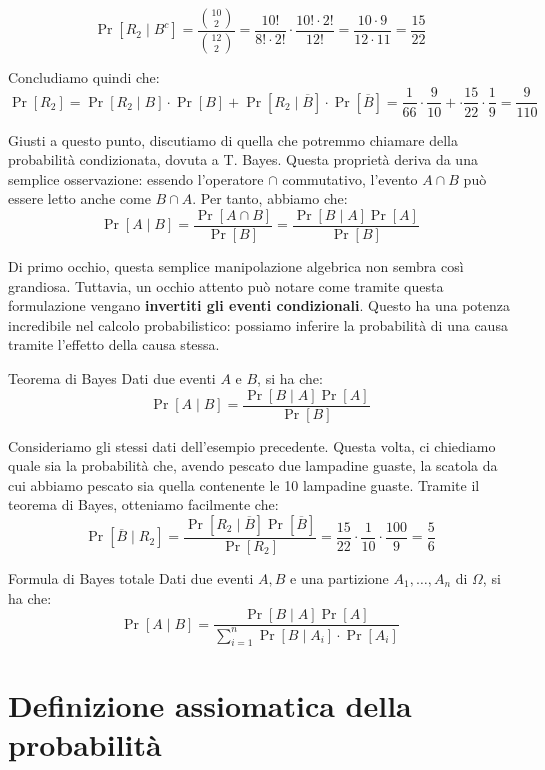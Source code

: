 \documentclass[a4paper, 12pt]{report}
\begin{document}
    \[ \Pr[R_2  \mid  B^c] = \frac{\binom{10}{2}}{\binom{12}{2}} = \frac{10!}{8! \cdot 2!} \cdot \frac{10! \cdot 2!}{12!} = \frac{10 \cdot 9}{12 \cdot 11} = \frac{15}{22}\]

    Concludiamo quindi che:
    \[ \Pr[R_2] = \Pr[R_2  \mid  B] \cdot \Pr[B] + \Pr[R_2  \mid  \overline{B}] \cdot \Pr[\overline{B}] = \frac{1}{66} \cdot \frac{9}{10} + \cdot \frac{15}{22} \cdot \frac{1}{9} = \frac{9}{110}\]
    
    Giusti a questo punto, discutiamo di quella che potremmo chiamare  della probabilità condizionata, dovuta a T. Bayes. Questa proprietà deriva da una semplice osservazione: essendo l'operatore $\cap$ commutativo, l'evento $A \cap B$ può essere letto anche come $B \cap A$. Per tanto, abbiamo che:
    \[\Pr[A \mid B] = \frac{\Pr[A \cap B]}{\Pr[B]} = \frac{\Pr[B \mid A] \Pr[A]}{\Pr[B]}\]
    
    Di primo occhio, questa semplice manipolazione algebrica non sembra così grandiosa. Tuttavia, un occhio attento può notare come tramite questa formulazione vengano \textbf{invertiti gli eventi condizionali}. Questo ha una potenza incredibile nel calcolo probabilistico: possiamo inferire la probabilità di una causa tramite l'effetto della causa stessa.

    \begin{framedthm}{Teorema di Bayes}
        Dati due eventi $A$ e $B$, si ha che:
        \[\Pr[A \mid B] = \frac{\Pr[B \mid A] \Pr[A]}{\Pr[B]}\]
    \end{framedthm}

    Consideriamo gli stessi dati dell'esempio precedente. Questa volta, ci chiediamo quale sia la probabilità che, avendo pescato due lampadine guaste, la scatola da cui abbiamo pescato sia quella contenente le 10 lampadine guaste. Tramite il teorema di Bayes, otteniamo facilmente che:
    \[\Pr[\overline{B} \mid R_2] = \frac{\Pr[R_2 \mid \overline{B}] \Pr[\overline{B}]}{\Pr[R_2]} = \frac{15}{22} \cdot \frac{1}{10} \cdot \frac{100}{9} = \frac{5}{6}\]

    \begin{framedcor}{Formula di Bayes totale}
        Dati due eventi $A,B$ e una partizione $A_1, \ldots, A_n$ di $\Omega$, si ha che:
        \[\Pr[A \mid B] = \frac{\Pr[B \mid A] \Pr[A]}{\sum_{i = 1}^n \Pr[B \mid A_i] \cdot \Pr[A_i]}\]
    \end{framedcor}

    \section{Definizione assiomatica della probabilità}
\end{document}

